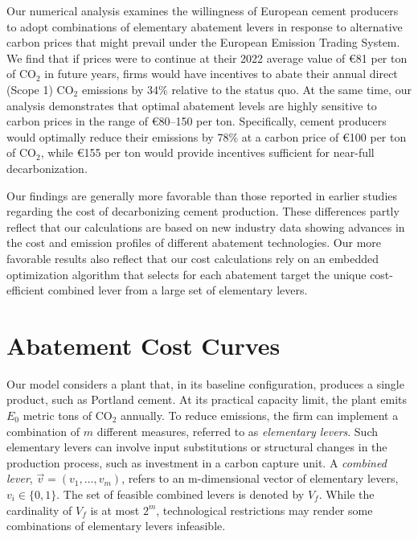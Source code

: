 \documentclass[12pt, a4paper]{article} %
\begin{document}
Our numerical analysis examines the willingness of European cement producers to adopt combinations of elementary abatement levers in response to alternative carbon prices that might prevail under the European Emission Trading System. We find that if prices were to continue at their 2022 average value of \euro 81 per ton of CO$_2$ in future years, firms would have incentives to abate their annual direct (Scope 1) CO$_2$ emissions by 34\%  relative to the status quo. At the same time, our analysis demonstrates that optimal abatement levels are highly sensitive to carbon prices in the range of \euro 80--150 per ton. Specifically, cement producers would optimally reduce their emissions by 78\% at a carbon price of \euro 100 per ton of CO$_2$, while \euro 155 per ton would provide incentives sufficient for near-full decarbonization.

Our findings are generally more favorable than those reported in earlier studies \citep{obrist2021decarbonization,zuberi2017bottom,huang2021bottom,dinga2022china,fennell2022going,strunge2022marginal} regarding the cost of decarbonizing cement production. These differences partly reflect that our calculations are based on new industry data showing advances in the cost and emission profiles of different abatement technologies. Our more favorable results also reflect that our cost calculations rely on an embedded optimization algorithm that selects for each abatement target the unique cost-efficient combined lever from a large set of elementary levers.

\section{Abatement Cost Curves}
\label{sec: lac}

Our model considers a plant that, in its baseline configuration, produces a single product, such as Portland cement. At its practical capacity limit,  the plant emits $E_0$ metric tons of CO$_2$ annually. To reduce emissions, the firm can implement a combination of $m$ different measures, referred to as \emph{elementary levers}. Such elementary levers can involve input substitutions or structural changes in the production process, such as investment in a carbon capture unit. A \emph{combined lever}, $\vec{v}=(v_1, \ldots ,v_m)$, refers to an m-dimensional vector of elementary levers, $v_i \in \{0,1\}$. The set of feasible combined levers is denoted by $V_f$. While the cardinality of $V_f$ is at most $2^m$, technological restrictions may render some combinations of elementary levers infeasible.
\end{document}
